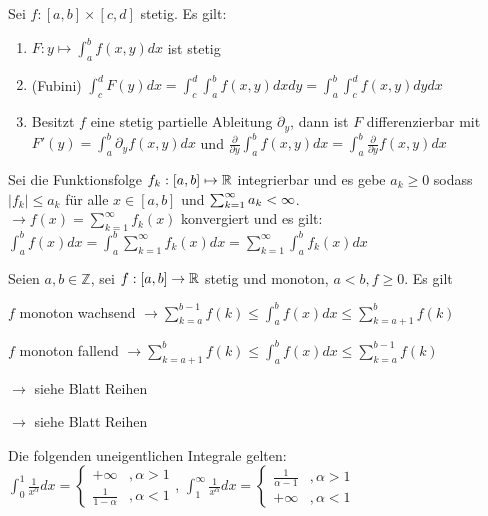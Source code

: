 \documentclass[]{article}
\begin{document}
\begin{satz}
	Sei $f : [a,b] \times [c,d]$ stetig. Es gilt:
	\begin{enumerate}[noitemsep]
		\item $F : y \mapsto \int_{a}^{b} f(x,y) dx$ ist stetig
		\item (Fubini) $\int_{c}^{d} F(y) dx= \int_{c}^{d} \int_{a}^{b} f(x,y) dx dy =  \int_{a}^{b} \int_{c}^{d} f(x,y) dy dx $
		\item Besitzt $f$ eine stetig partielle Ableitung $\partial_y$, dann ist $F$ differenzierbar mit $F'(y) = \int_{a}^{b} \partial_y f(x,y) dx$ und $\frac{\partial}{\partial y} \int_{a}^{b} f(x,y) dx = \int_{a}^{b} \frac{\partial}{\partial y} f(x,y) dx$ 
	\end{enumerate}
\end{satz}

\begin{satz}
	Sei die Funktionsfolge $f_k : [a,b] \mapsto \mathbb{R}$ integrierbar und es gebe $a_k \geq 0$ sodass $|f_k| \leq a_k$ für alle $x \in [a,b]$ und $\sum_{k = 1}^{\infty} a_{k} < \infty$. \\
	$\rightarrow f(x) = \sum_{k=1}^{\infty} f_k(x)$ konvergiert und es gilt: $\int_{a}^{b}f(x)dx = \int_{a}^{b} \sum_{k=1}^{\infty} f_k(x)dx =  \sum_{k=1}^{\infty} \int_{a}^{b}f_k(x) dx$
\end{satz}

\begin{satz}
	Seien $a,b \in \mathbb{Z}$, sei $f : [a,b] \rightarrow \mathbb{R}$ stetig und monoton, $a < b, f \geq 0$. Es gilt
	\begin{description}[noitemsep]
		\item $f$ monoton wachsend $\rightarrow \sum_{k=a}^{b-1} f(k) \leq \int_{a}^{b}f(x)dx \leq \sum_{k=a+1}^{b}f(k)$
		\item $f$ monoton fallend  $\rightarrow \sum_{k=a+1}^{b} f(k) \leq \int_{a}^{b}f(x)dx \leq \sum_{k=a}^{b-1}f(k)$
	\end{description}
\end{satz}

\begin{satz}
	$\rightarrow$ siehe Blatt Reihen
\end{satz}

\begin{satz}
	$\rightarrow$ siehe Blatt Reihen
\end{satz}

\begin{satz}
	Die folgenden uneigentlichen Integrale gelten: \\
	$\int_{0}^{1} \frac{1}{x^\alpha} dx = 
		\begin{cases}
			+ \infty              &, \alpha > 1 \\ 
	 		\frac{1}{1 - \alpha}  &, \alpha < 1
		\end{cases}$, 
	$\int_{1}^{\infty} \frac{1}{x^\alpha} dx = 
		\begin{cases}
			\frac{1}{\alpha - 1}  &, \alpha > 1 \\
			+ \infty              &, \alpha < 1 
		\end{cases}$
\end{satz}
\end{document}
